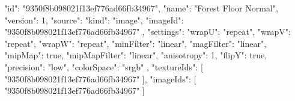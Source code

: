 {
  "id": "9350f8b098021f13ef776ad66fb34967",
  "name": "Forest Floor Normal",
  "version": 1,
  "source": {
    "kind": "image",
    "imageId": "9350f8b098021f13ef776ad66fb34967"
  },
  "settings": {
    "wrapU": "repeat",
    "wrapV": "repeat",
    "wrapW": "repeat",
    "minFilter": "linear",
    "magFilter": "linear",
    "mipMap": true,
    "mipMapFilter": "linear",
    "anisotropy": 1,
    "flipY": true,
    "precision": "low",
    "colorSpace": "srgb"
  },
  "textureIds": [
    "9350f8b098021f13ef776ad66fb34967"
  ],
  "imageIds": [
    "9350f8b098021f13ef776ad66fb34967"
  ]
}
